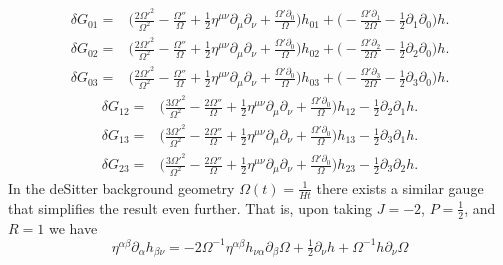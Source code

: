 \documentclass[10pt,letterpaper]{article}
\begin{document}
\begin{align}
\delta G_{01}={}&\bigg(\frac{2 \Omega '^2}{\Omega^2}
 -  \frac{\Omega ''}{\Omega}
 + \tfrac{1}{2} \eta^{\mu \nu} \partial_{\mu} \partial_{\nu}
 + \frac{\Omega ' \partial_{0}}{\Omega}\bigg) h_{01}
 + \bigg(- \frac{\Omega ' \partial_{1}}{2 \Omega}
 -  \tfrac{1}{2} \partial_{1} \partial_{0}\bigg) h.
\end{align}
\begin{align}
\delta G_{02}={}&\bigg(\frac{2 \Omega '^2}{\Omega^2}
 -  \frac{\Omega ''}{\Omega}
 + \tfrac{1}{2} \eta^{\mu \nu} \partial_{\mu} \partial_{\nu}
 + \frac{\Omega ' \partial_{0}}{\Omega}\bigg) h_{02}
 + \bigg(- \frac{\Omega ' \partial_{2}}{2 \Omega}
 -  \tfrac{1}{2} \partial_{2} \partial_{0}\bigg) h.
\end{align}
\begin{align}
\delta G_{03}={}&\bigg(\frac{2 \Omega '^2}{\Omega^2}
 -  \frac{\Omega ''}{\Omega}
 + \tfrac{1}{2} \eta^{\mu \nu} \partial_{\mu} \partial_{\nu}
 + \frac{\Omega ' \partial_{0}}{\Omega}\bigg) h_{03}
 + \bigg(- \frac{\Omega ' \partial_{3}}{2 \Omega}
 -  \tfrac{1}{2} \partial_{3} \partial_{0}\bigg) h.
\end{align}
\begin{align}
\delta G_{12}={}&\bigg(\frac{3 \Omega '^2}{\Omega^2}
 -  \frac{2 \Omega ''}{\Omega}
 + \tfrac{1}{2} \eta^{\mu \nu} \partial_{\mu} \partial_{\nu}
 + \frac{\Omega ' \partial_{0}}{\Omega}\bigg) h_{12}
 -  \tfrac{1}{2} \partial_{2} \partial_{1} h.
\end{align}
\begin{align}
\delta G_{13}={}&\bigg(\frac{3 \Omega '^2}{\Omega^2}
 -  \frac{2 \Omega ''}{\Omega}
 + \tfrac{1}{2} \eta^{\mu \nu} \partial_{\mu} \partial_{\nu}
 + \frac{\Omega ' \partial_{0}}{\Omega}\bigg) h_{13}
 -  \tfrac{1}{2} \partial_{3} \partial_{1} h.
\end{align}
\begin{align}
\delta G_{23}={}&\bigg(\frac{3 \Omega '^2}{\Omega^2}
 -  \frac{2 \Omega ''}{\Omega}
 + \tfrac{1}{2} \eta^{\mu \nu} \partial_{\mu} \partial_{\nu}
 + \frac{\Omega ' \partial_{0}}{\Omega}\bigg) h_{23}
 -  \tfrac{1}{2} \partial_{3} \partial_{2} h.
\end{align}
In the deSitter background geometry $\Omega(t) = \frac{1}{Ht}$ there exists a similar gauge that simplifies the result even further. That is, upon taking $J = -2$, $P = \tfrac12$, and $R = 1$ we have
\begin{equation}
	\eta^{\alpha\beta}\partial_{\alpha}h_{\beta\nu} = -2 \Omega^{-1}  \eta^{\alpha\beta}h_{\nu\alpha}\partial_\beta \Omega + \tfrac{1}{2} \partial_\nu h +  \Omega^{-1} h \partial_\nu \Omega
\end{equation}
\end{document}
